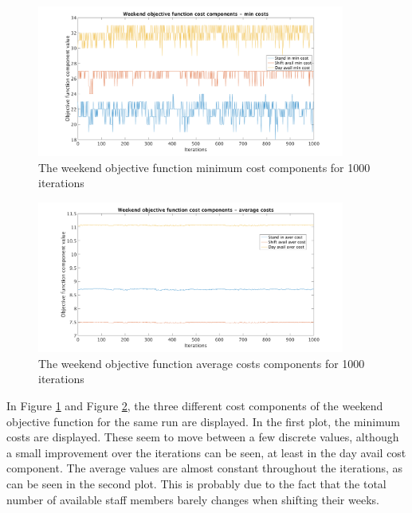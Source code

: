\begin{figure}[!htbp]
\centering
\includegraphics[width=0.9\textwidth, trim = 100px 0px 100px 20px, clip]{Chapters/ImagesEmelie/Components_1000_20.png}
\caption{The weekend objective function minimum cost components for 1000 iterations}
\label{fig:obj_fun_comp}
\end{figure}

\begin{figure}[!h]
\centering
\includegraphics[width=0.9\textwidth, trim = 100px 0px 100px 20px, clip]{Chapters/ImagesEmelie/Components_av_1000_20.png}
\caption{The weekend objective function average costs components for 1000 iterations}
\label{fig:obj_fun_comp_aver}
\end{figure}


In Figure \ref{fig:obj_fun_comp} and Figure \ref{fig:obj_fun_comp_aver}, the three different cost components of the weekend objective function for the same run are displayed. In the first plot, the minimum costs are displayed. These seem to move between a few discrete values, although a small improvement over the iterations can be seen, at least in the day avail cost component. The average values are almost constant throughout the iterations, as can be seen in the second plot. This is probably due to the fact that the total number of available staff members barely changes when shifting their weeks.

